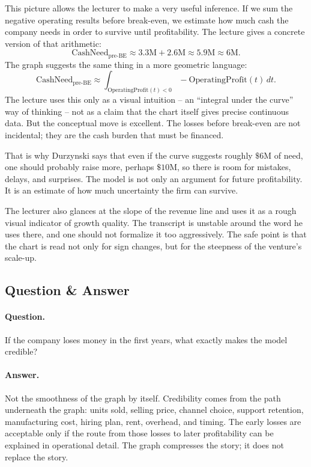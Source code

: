 This picture allows the lecturer to make a very useful inference. If we sum the negative operating results before break-even, we estimate how much cash the company needs in order to survive until profitability. The lecture gives a concrete version of that arithmetic:
\begin{equation}
\mathrm{CashNeed}_{\mathrm{pre\mbox{-}BE}} \approx 3.3\text{M} + 2.6\text{M}
\approx 5.9\text{M} \approx 6\text{M}.
\end{equation}
The graph suggests the same thing in a more geometric language:
\begin{equation}
\mathrm{CashNeed}_{\mathrm{pre\mbox{-}BE}}
\approx
\int_{\mathrm{OperatingProfit}(t)<0}
-\mathrm{OperatingProfit}(t)\,dt.
\end{equation}
The lecture uses this only as a visual intuition -- an ``integral under the curve'' way of thinking -- not as a claim that the chart itself gives precise continuous data. But the conceptual move is excellent. The losses before break-even are not incidental; they are the cash burden that must be financed.

That is why Durzynski says that even if the curve suggests roughly \(\$6\text{M}\) of need, one should probably raise more, perhaps \(\$10\text{M}\), so there is room for mistakes, delays, and surprises. The model is not only an argument for future profitability. It is an estimate of how much uncertainty the firm can survive.

The lecturer also glances at the slope of the revenue line and uses it as a rough visual indicator of growth quality. The transcript is unstable around the word he uses there, and one should not formalize it too aggressively. The safe point is that the chart is read not only for sign changes, but for the steepness of the venture's scale-up.

\subsection{Question \& Answer}

\paragraph{Question.}
If the company loses money in the first years, what exactly makes the model credible?

\paragraph{Answer.}
Not the smoothness of the graph by itself. Credibility comes from the path underneath the graph: units sold, selling price, channel choice, support retention, manufacturing cost, hiring plan, rent, overhead, and timing. The early losses are acceptable only if the route from those losses to later profitability can be explained in operational detail. The graph compresses the story; it does not replace the story.

